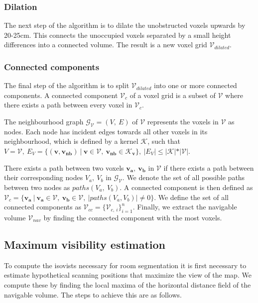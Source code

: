 \subsubsection{Dilation}
The next step of the algorithm is to dilate the unobstructed voxels upwards by 20-25cm. This connects the unoccupied voxels separated by a small height differences into a connected volume. The result is a new voxel grid \(\mathcal{V}_{dilated}\). 

\subsubsection{Connected components}
The final step of the algorithm is to split \(\mathcal{V}_{dilated}\) into one or more connected components. A connected component \(\mathcal{V}_c\) of a voxel grid is a subset of \(\mathcal{V}\) where there exists a path between every voxel in \(\mathcal{V}_c\). 

The neighbourhood graph \(\mathcal{G}_{\mathcal{V}} = (V,\ E)\) of \(\mathcal{V}\) represents the voxels in \(\mathcal{V}\) as nodes. Each node has incident edges towards all other voxels in its neighbourhood, which is defined by a kernel \(\mathcal{K}\), such that \(V = \mathcal{V},\ E_{V} = \{(\boldsymbol{v}, \boldsymbol{v_{nb}})\ |\ \boldsymbol{v} \in \mathcal{V},\ \boldsymbol{v_{nb}} \in \mathcal{K}_{\boldsymbol{v}}\},\ |E_{V}| \leq |\mathcal{K}|*|\mathcal{V}|\). 

There exists a path between two voxels \(\boldsymbol{v_a},\ \boldsymbol{v_b}\) in \(\mathcal{V}\) if there exists a path between their corresponding nodes \(V_a,\ V_b\) in \(\mathcal{G}_{\mathcal{V}}\). We denote the set of all possible paths between two nodes as \(paths(V_a,\ V_b)\). A connected component is then defined as \(\mathcal{V}_c=\{\boldsymbol{v_a}\ |\ \boldsymbol{v_a} \in \mathcal{V},\ \boldsymbol{v_b} \in \mathcal{V},\ |paths(V_a, V_b)| \neq 0\}\). We define the set of all connected components as \(\mathcal{V}_{cc}=\{\mathcal{V}_{c,\ i}\}_{i=1}^n\). Finally, we extract the navigable volume \(\mathcal{V}_{nav}\) by finding the connected component with the most voxels. 

\subsection{Maximum visibility estimation}
To compute the isovists necessary for room segmentation it is first necessary to estimate hypothetical scanning positions that maximize the view of the map. We compute these by finding the local maxima of the horizontal distance field of the navigable volume. The steps to achieve this are as follows. 

